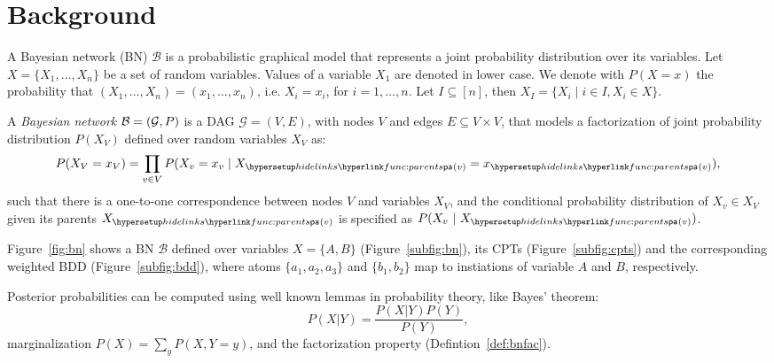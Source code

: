 
\section{Background}
\label{sec:background}

A Bayesian network (BN) $\mathcal{B}$ is a probabilistic graphical model that represents a joint probability distribution over its variables. Let $X = \{X_1,\ldots,X_n\}$ be a set of random variables.
Values of a variable $X_1$ are denoted in lower case.
We denote with $P(X = x)$ the probability that $(X_1,\ldots,X_n) = (x_1,\ldots,x_n)$,
i.e. $X_i = x_i$, for $i =1,\ldots,n$.
Let  $I \subseteq [n]$, then $X_I = \{X_i \mid i \in I, X_i \in X\}$. %

\begin{definition}\label{def:bnfac}
    \ULforem
    A \emph{Bayesian network} $\mathcal{B} = \left( \mathcal{G},P \right)$ is a DAG $\mathcal{G} = (V,E)$, with nodes $V$ and edges $E \subseteq V \times V$, that models a factorization of joint probability distribution $P(X_V)$ defined over random variables $X_V$ as:%
    \begin{equation}
    P(X_V = x_V) = \prod_{v \in V}P(X_v = x_v \mid X_{\myparents(v)}= x_{\myparents(v)}),
    \end{equation}%
    \noindent such that there is a one-to-one correspondence between nodes $V$ and variables $X_V$, and the conditional probability distribution of $X_v \in X_V$ given its parents $X_{\myparents(v)}$ is specified as $P(X_v\ |\ X_{\myparents(v)})$.

\end{definition}

\begin{example}\label{ex:full}\label{ex:bn}
 Figure~\ref{fig:bn} shows a BN $\mathcal{B}$ defined over variables $X = \{A,B\}$ (Figure~\ref{subfig:bn}), its CPTs (Figure~\ref{subfig:cpts}) and the corresponding weighted BDD (Figure~\ref{subfig:bdd}), where atoms $\{a_1,a_2,a_3\}$ and $\{b_1,b_2\}$ map to instiations of variable $A$ and $B$, respectively.
 \vspace{-2em}

\end{example}

Posterior probabilities can be computed using well known lemmas in probability theory, like Bayes’ theorem:
\[P(X | Y) = \frac{P(X | Y)P(Y)}{P(Y)},\]
marginalization $P(X) = \sum_{y} P(X, Y = y)$, and the factorization property (Defintion~\ref{def:bnfac}).


